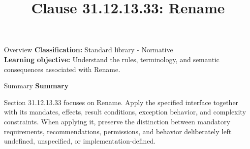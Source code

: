 \documentclass[10pt,letterpaper]{article}
\title{Clause 31.12.13.33: Rename}
\author{}
\date{}
\begin{document}
\maketitle
\begin{CornellOverviewBox}{Overview}
\textbf{Classification:} Standard library - Normative\\[2pt]
\textbf{Learning objective:} Understand the rules, terminology, and semantic consequences associated with Rename.
\end{CornellOverviewBox}\begin{CornellSummaryBox}{Summary}
{\sffamily\bfseries\color{Accent} Summary}\par\vspace{3pt}Section 31.12.13.33 focuses on Rename. Apply the specified interface together with its mandates, effects, result conditions, exception behavior, and complexity constraints. When applying it, preserve the distinction between mandatory requirements, recommendations, permissions, and behavior deliberately left undefined, unspecified, or implementation-defined.
\end{CornellSummaryBox}
\end{document}
